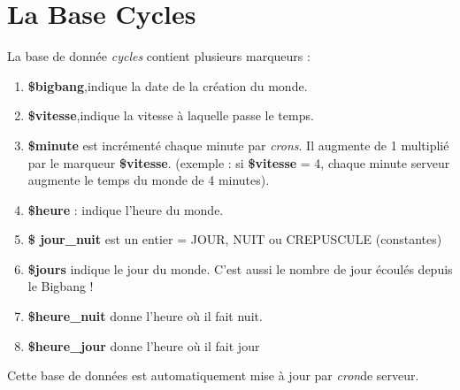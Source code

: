 \documentclass[french]{report}
\newlength{\du}\fi
\begin{document}
\section{La Base Cycles}\label{base_cycles}
La base de donnée \textit{cycles} contient plusieurs marqueurs : 
\begin{enumerate}
	\item  \textbf{\$bigbang},indique la date de la création du monde.
	\item  \textbf{\$vitesse},indique la vitesse à laquelle passe le temps.
	\item  \textbf{\$minute} est incrémenté chaque minute par \textit{crons}\footnotemark[1]. Il augmente de 1 multiplié par le marqueur  \textbf{\$vitesse}. (exemple : si \textbf{\$vitesse} = 4, chaque minute serveur augmente le temps du monde de 4 minutes).
	\item  \textbf{\$heure} : indique l'heure du monde.
	\item \textbf{\$ jour\_nuit} est un entier = JOUR, NUIT ou CREPUSCULE (constantes)
	\item \textbf{\$jours} indique le jour du monde. C'est aussi le nombre de jour écoulés depuis le Bigbang !
	\item \textbf{\$heure\_nuit} donne l'heure où il fait nuit.
	\item \textbf{\$heure\_jour} donne l'heure où il fait jour
\end{enumerate}
Cette base de données est automatiquement mise à jour par \textit{cron}\footnotemark[1] de serveur.\\

\end{document}
